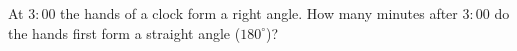 At $3{:}00$ the hands of a clock form a right angle. How many minutes after $3{:}00$ do the hands first form a straight angle ($180^\circ$)?
